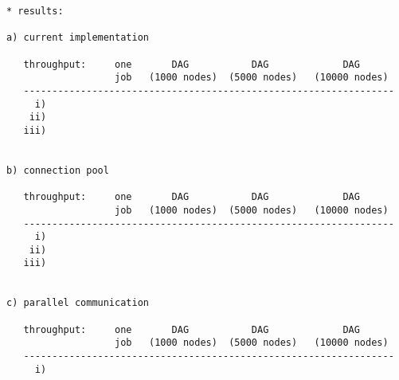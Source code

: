 \documentclass{egee}
\begin{document}
\begin{verbatim}
* results:

a) current implementation

   throughput:     one       DAG           DAG             DAG
                   job   (1000 nodes)  (5000 nodes)   (10000 nodes)
   -----------------------------------------------------------------
     i)
    ii)
   iii)


b) connection pool

   throughput:     one       DAG           DAG             DAG
                   job   (1000 nodes)  (5000 nodes)   (10000 nodes)
   -----------------------------------------------------------------
     i)
    ii)
   iii)


c) parallel communication

   throughput:     one       DAG           DAG             DAG
                   job   (1000 nodes)  (5000 nodes)   (10000 nodes)
   -----------------------------------------------------------------
     i)



\end{verbatim}
\end{document}
